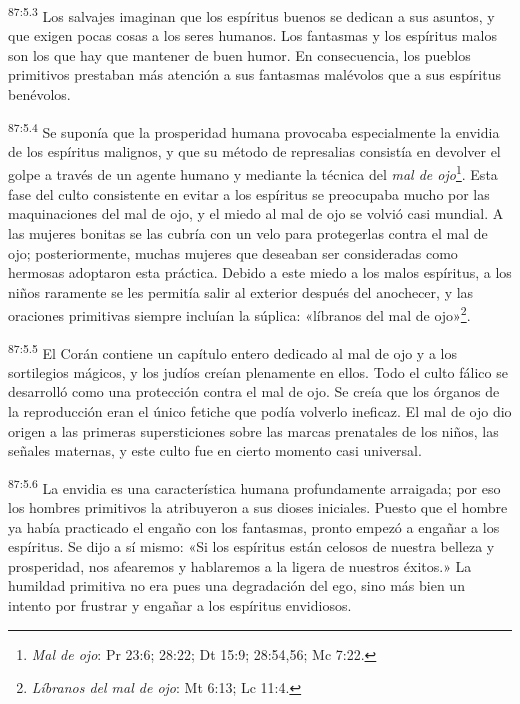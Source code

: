 \par
\textsuperscript{87:5.3} Los salvajes imaginan que los espíritus buenos se dedican a sus asuntos, y que exigen pocas cosas a los seres humanos. Los fantasmas y los espíritus malos son los que hay que mantener de buen humor. En consecuencia, los pueblos primitivos prestaban más atención a sus fantasmas malévolos que a sus espíritus benévolos.

\par
\textsuperscript{87:5.4} Se suponía que la prosperidad humana provocaba especialmente la envidia de los espíritus malignos, y que su método de represalias consistía en devolver el golpe a través de un agente humano y mediante la técnica del \textit{mal de ojo}\footnote{\textit{Mal de ojo}: Pr 23:6; 28:22; Dt 15:9; 28:54,56; Mc 7:22.}. Esta fase del culto consistente en evitar a los espíritus se preocupaba mucho por las maquinaciones del mal de ojo, y el miedo al mal de ojo se volvió casi mundial. A las mujeres bonitas se las cubría con un velo para protegerlas contra el mal de ojo; posteriormente, muchas mujeres que deseaban ser consideradas como hermosas adoptaron esta práctica. Debido a este miedo a los malos espíritus, a los niños raramente se les permitía salir al exterior después del anochecer, y las oraciones primitivas siempre incluían la súplica: «líbranos del mal de ojo»\footnote{\textit{Líbranos del mal de ojo}: Mt 6:13; Lc 11:4.}.

\par
\textsuperscript{87:5.5} El Corán contiene un capítulo entero dedicado al mal de ojo y a los sortilegios mágicos, y los judíos creían plenamente en ellos. Todo el culto fálico se desarrolló como una protección contra el mal de ojo. Se creía que los órganos de la reproducción eran el único fetiche que podía volverlo ineficaz. El mal de ojo dio origen a las primeras supersticiones sobre las marcas prenatales de los niños, las señales maternas, y este culto fue en cierto momento casi universal.

\par
\textsuperscript{87:5.6} La envidia es una característica humana profundamente arraigada; por eso los hombres primitivos la atribuyeron a sus dioses iniciales. Puesto que el hombre ya había practicado el engaño con los fantasmas, pronto empezó a engañar a los espíritus. Se dijo a sí mismo: «Si los espíritus están celosos de nuestra belleza y prosperidad, nos afearemos y hablaremos a la ligera de nuestros éxitos.» La humildad primitiva no era pues una degradación del ego, sino más bien un intento por frustrar y engañar a los espíritus envidiosos.

